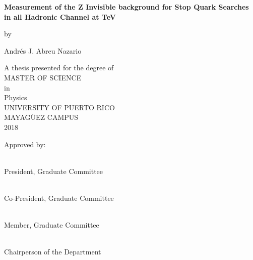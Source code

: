\begin{titlepage}
    \begin{center}
    
       \BgThispage
        \vspace*{1cm}
      \Large  
        \textbf{Measurement of the Z Invisible background for Stop Quark Searches in all Hadronic Channel at  TeV}
        
        \normalsize
        \vspace{0.5cm}
        by
        
        \vspace{0.25cm}
        
        Andr\'es J. Abreu Nazario
        
        \vspace{0.5cm}	
        
        A thesis presented for the degree of\\
        \vspace{0.5cm}
        MASTER OF SCIENCE\\
        \vspace{0.5cm}
        in\\
        \vspace{0.5cm}
        Physics\\
        \vspace{0.5cm}
        UNIVERSITY OF PUERTO RICO\\
        MAYAG\"UEZ CAMPUS\\
        2018
        \vspace{0.8cm}
        
        \end{center}
        
        Approved by:
        
        \vspace{1.0cm}

\\President, Graduate Committee

\vspace{1.0cm}

\\Co-President, Graduate Committee

\vspace{1.0cm}

\\Member, Graduate Committee

\vspace{1.0cm}

\\Chairperson of the Department



\end{titlepage}